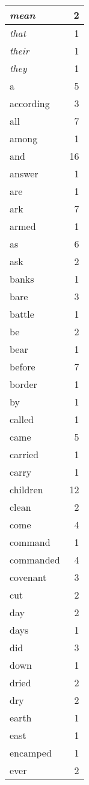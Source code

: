 \begin{center}
\begin{longtable}{l|r}
\emph{mean} & 2\\ \hline 
\emph{that} & 1\\ \hline 
\emph{their} & 1\\ \hline 
\emph{they} & 1\\ \hline 
a & 5\\ \hline 
according & 3\\ \hline 
all & 7\\ \hline 
among & 1\\ \hline 
and & 16\\ \hline 
answer & 1\\ \hline 
are & 1\\ \hline 
ark & 7\\ \hline 
armed & 1\\ \hline 
as & 6\\ \hline 
ask & 2\\ \hline 
banks & 1\\ \hline 
bare & 3\\ \hline 
battle & 1\\ \hline 
be & 2\\ \hline 
bear & 1\\ \hline 
before & 7\\ \hline 
border & 1\\ \hline 
by & 1\\ \hline 
called & 1\\ \hline 
came & 5\\ \hline 
carried & 1\\ \hline 
carry & 1\\ \hline 
children & 12\\ \hline 
clean & 2\\ \hline 
come & 4\\ \hline 
command & 1\\ \hline 
commanded & 4\\ \hline 
covenant & 3\\ \hline 
cut & 2\\ \hline 
day & 2\\ \hline 
days & 1\\ \hline 
did & 3\\ \hline 
down & 1\\ \hline 
dried & 2\\ \hline 
dry & 2\\ \hline 
earth & 1\\ \hline 
east & 1\\ \hline 
encamped & 1\\ \hline 
ever & 2\\ \hline 

\end{longtable}
\end{center}
